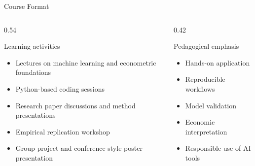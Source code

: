 \documentclass[aspectratio=169,11pt]{beamer}
\begin{document}
\begin{frame}{Course Format}
\begin{columns}[T,onlytextwidth]
\begin{column}{0.54\textwidth}
\begin{block}{Learning activities}
\begin{itemize}
    \item Lectures on machine learning and econometric foundations
    \item Python-based coding sessions
    \item Research paper discussions and method presentations
    \item Empirical replication workshop
    \item Group project and conference-style poster presentation
\end{itemize}
\end{block}
\end{column}
\begin{column}{0.42\textwidth}
\begin{block}{Pedagogical emphasis}
\begin{itemize}
    \item Hands-on application
    \item Reproducible workflows
    \item Model validation
    \item Economic interpretation
    \item Responsible use of AI tools
\end{itemize}
\end{block}
\end{column}
\end{columns}
\end{frame}
\end{document}
